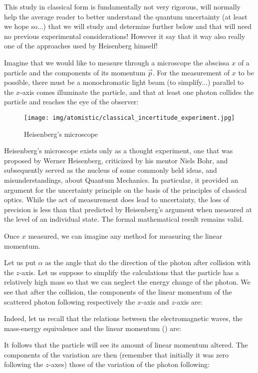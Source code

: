 	This study in classical form is fundamentally not very rigorous, will normally help the average reader to better understand the quantum uncertainty (at least we hope so...) that we will study and determine further below and that will need no previous experimental considerations! However it say that it way also really one of the approaches used by Heisenberg himself!
	
	Imagine that we would like to measure through a microscope the abscissa $x$ of a particle and the components of its momentum $\vec{p}$. For the measurement of $x$ to be possible, there must be a monochromatic light beam (to simplify...) parallel to the $x$-axis comes illuminate the particle, and that at least one photon collides the particle and reaches the eye of the observer: 
	\begin{figure}[H]
		\centering
		\texttt{[image: img/atomistic/classical\_incertitude\_experiment.jpg]}
		\caption{Heisenberg's microscope}
	\end{figure}
	\begin{tcolorbox}[title=Remark,colframe=black,arc=10pt]
	Heisenberg's microscope exists only as a thought experiment, one that was proposed by Werner Heisenberg, criticized by his mentor Niels Bohr, and subsequently served as the nucleus of some commonly held ideas, and misunderstandings, about Quantum Mechanics. In particular, it provided an argument for the uncertainty principle on the basis of the principles of classical optics. While the act of measurement does lead to uncertainty, the loss of precision is less than that predicted by Heisenberg's argument when measured at the level of an individual state. The formal mathematical result remains valid.
	\end{tcolorbox}
	Once $x$ measured, we can imagine any method for measuring the linear momentum.

	Let us put $\alpha$ as the angle that do the direction of the photon after collision with the $z$-axis. Let us suppose to simplify the calculations that the particle has a relatively high mass so that we can neglect the energy change of the photon. We see that after the collision, the components of the linear momentum of the scattered photon following respectively the $x$-axis and $z$-axis are:
	
	Indeed, let us recall that the relations between the electromagnetic waves, the mass-energy equivalence and the linear momentum () are:
	
	It follows that the particle will see its amount of linear momentum altered. The components of the variation are then (remember that initially it was zero following the $z$-axes) those of the variation of the photon following:
	
